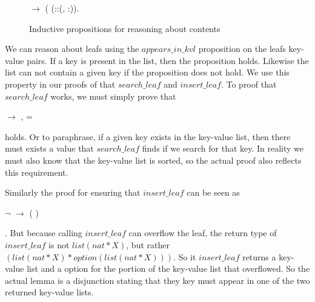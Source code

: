 \begin{figure}
\begin{coqdoccode}
  \coqdocindent{8.00em}
   \coqdocnotation{\ensuremath{\le}}  \ensuremath{\rightarrow}\coqdoceol
  \coqdocindent{8.00em}
    (   (::(,  :)).\coqdoceol
\end{coqdoccode}
\caption{Inductive propositions for reasoning about contents}
\label{fig:aik_and_ait}
\end{figure}

We can reason about leafs using the $appears\_in\_kvl$ proposition on the leafs key-value pairs. If a key is present in the list, then the proposition holds. Likewise the list can not contain a given key if the proposition does not hold. We use this property in our proofs of that $search\_leaf$ and $insert\_leaf$. To proof that $search\_leaf$ works, we must simply prove that \begin{coqdoccode} 
    
  \ensuremath{\rightarrow} \coqdocvar{\ensuremath{\exists}} , 
     =  
\end{coqdoccode} holds. Or to paraphrase, if a given key exists in the key-value list, then there must exists a value that $search\_leaf$ finds if we search for that key. In reality we must also know that the key-value list is sorted, so the actual proof also reflects this requirement.

Similarly the proof for ensuring that $insert\_leaf$ can be seen as \begin{coqdoccode}
\ensuremath{\lnot}    \ensuremath{\rightarrow}   (   )
\end{coqdoccode}. But because calling $insert\_leaf$ can overflow the leaf, the return type of $insert\_leaf$ is not $list(nat * X)$, but rather $(list (nat * X) * option (list (nat * X)))$. So it $insert\_leaf$ returns a key-value list and a option for the portion of the key-value list that overflowed. So the actual lemma is a disjunction stating that they key must appear in one of the two returned key-value lists.


